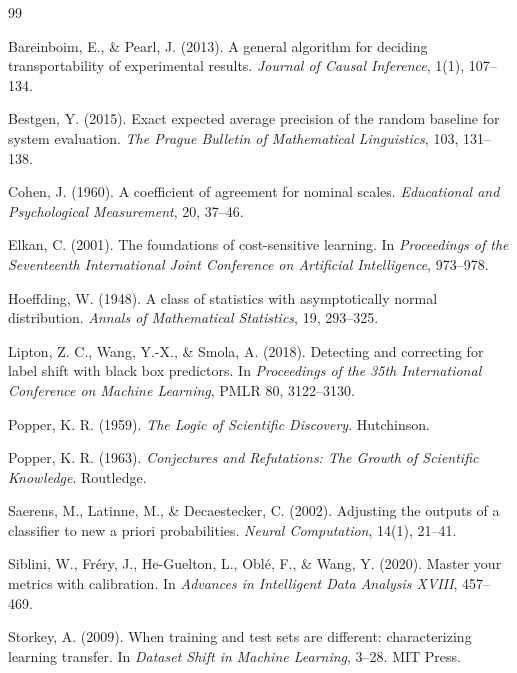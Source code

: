 \documentclass[11pt]{article}
\theoremstyle{remark}
\begin{document}
\begin{thebibliography}{99}

Bareinboim, E., \& Pearl, J. (2013).
A general algorithm for deciding transportability of experimental results.
\emph{Journal of Causal Inference}, 1(1), 107--134.

Bestgen, Y. (2015).
Exact expected average precision of the random baseline for system evaluation.
\emph{The Prague Bulletin of Mathematical Linguistics}, 103, 131--138.

Cohen, J. (1960).
A coefficient of agreement for nominal scales.
\emph{Educational and Psychological Measurement}, 20, 37--46.

Elkan, C. (2001).
The foundations of cost-sensitive learning.
In \emph{Proceedings of the Seventeenth International Joint Conference on Artificial Intelligence}, 973--978.

Hoeffding, W. (1948).
A class of statistics with asymptotically normal distribution.
\emph{Annals of Mathematical Statistics}, 19, 293--325.

Lipton, Z. C., Wang, Y.-X., \& Smola, A. (2018).
Detecting and correcting for label shift with black box predictors.
In \emph{Proceedings of the 35th International Conference on Machine Learning}, PMLR 80, 3122--3130.

Popper, K. R. (1959).
\emph{The Logic of Scientific Discovery}.
Hutchinson.

Popper, K. R. (1963).
\emph{Conjectures and Refutations: The Growth of Scientific Knowledge}.
Routledge.

Saerens, M., Latinne, M., \& Decaestecker, C. (2002).
Adjusting the outputs of a classifier to new a priori probabilities.
\emph{Neural Computation}, 14(1), 21--41.

Siblini, W., Fr\'ery, J., He-Guelton, L., Obl\'e, F., \& Wang, Y. (2020).
Master your metrics with calibration.
In \emph{Advances in Intelligent Data Analysis XVIII}, 457--469.

Storkey, A. (2009).
When training and test sets are different: characterizing learning transfer.
In \emph{Dataset Shift in Machine Learning}, 3--28. MIT Press.

\end{thebibliography}
\end{document}
